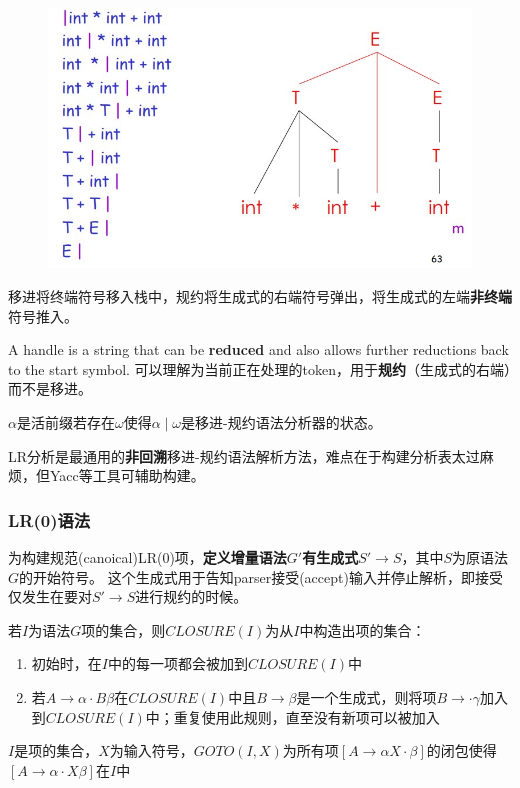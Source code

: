 \begin{figure}[H]
\centering
\includegraphics[width=0.8\linewidth]{fig/shift-reduce.jpg}
\end{figure}
移进将终端符号移入栈中，规约将生成式的右端符号弹出，将生成式的左端\textbf{非终端}符号推入。

\begin{definition}[句柄(handle)]
A handle is a string that can be \textbf{reduced} and also allows further reductions back to the start symbol.
可以理解为当前正在处理的token，用于\textbf{规约}（生成式的右端）而不是移进。
\end{definition}

\begin{definition}
$\alpha$是活前缀若存在$\omega$使得$\alpha\mid\omega$是移进-规约语法分析器的状态。
\end{definition}

LR分析是最通用的\textbf{非回溯}移进-规约语法解析方法，难点在于构建分析表太过麻烦，但Yacc等工具可辅助构建。

\subsubsection{LR(0)语法}
为构建规范(canoical)LR(0)项，\textbf{定义增量语法$G'$有生成式$S'\to S$}，其中$S$为原语法$G$的开始符号。
这个生成式用于告知parser接受(accept)输入并停止解析，即接受仅发生在要对$S'\to S$进行规约的时候。

\begin{definition}[CLOSURE]
若$I$为语法$G$项的集合，则$CLOSURE(I)$为从$I$中构造出项的集合：
\begin{enumerate}
	\item 初始时，在$I$中的每一项都会被加到$CLOSURE(I)$中
	\item 若$A\to\alpha\cdot B\beta$在$CLOSURE(I)$中且$B\to\beta$是一个生成式，则将项$B\to\cdot\gamma$加入到$CLOSURE(I)$中；重复使用此规则，直至没有新项可以被加入
\end{enumerate}
\end{definition}
\begin{definition}[GOTO]
$I$是项的集合，$X$为输入符号，$GOTO(I,X)$为所有项$[A\to\alpha X\cdot\beta]$的闭包使得$[A\to\alpha\cdot X\beta]$在$I$中
\end{definition}

